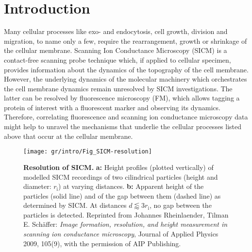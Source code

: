 \section{Introduction}
\label{sec:introduction}
Many cellular processes like exo- and endocytosis, cell growth, division and
migration, to name only a few, require the rearrangement, growth or shrinkage
of the cellular membrane. Scanning Ion Conductance Microscopy (SICM)
\cite{Hansma1989} is a contact-free scanning probe technique which, if applied
to cellular specimen, provides information about the dynamics of the
topography of the cell membrane. However, the underlying dynamics of the
molecular machinery which orchestrates the cell membrane dynamics remain
unresolved by SICM investigations. The latter can be resolved by fluorescence
microscopy (FM), which allows tagging a protein of interest with a fluorescent
marker and observing its dynamics. Therefore, correlating fluorescence and
scanning ion conductance microscopy data might help to unravel the mechanisms
that underlie the cellular processes listed above that occur at the cellular
membrane.

\begin{figure}\centering
  \texttt{[image: gr/intro/Fig\_SICM-resolution]}
  \caption{\textbf{Resolution of SICM.}  \textbf{a:} Height profiles
    (plotted vertically) of modelled SICM recordings of two cilindrical
    particles (height and diameter: $r_\text{i}$) at varying
    distances. \textbf{b:} Apparent height of the particles (solid line) and of
    the gap between them (dashed line) as determined by SICM. At distances
    $d\lessapprox3r_\text{i}$, no gap between the particles is detected.
    Reprinted from Johannes Rheinlaender, Tilman E. Schäffer: \emph{Image
      formation, resolution, and height measurement in scanning ion
      conductance microscopy}, Journal of Applied Physics 2009, 105(9), with
    the permission of AIP Publishing.  }
  \label{fig:sicm-resolution}
\end{figure}
  
